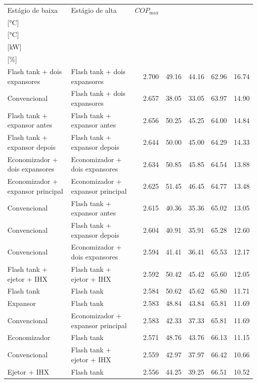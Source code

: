 {\small\setlength{\tabcolsep}{4pt}\renewcommand{\arraystretch}{1.12}
\begin{tabular}{llrrrrr}
\toprule
Estágio de baixa & Estágio de alta & $COP_{\max}$ & \shortstack{$T_{\mathrm{cond,l}}^*$\\{[°C]}} & \shortstack{$T_{\mathrm{evap,h}}^*$\\{[°C]}} & \shortstack{$\dot W_{\mathrm{liq}}$\\{[kW]}} & \shortstack{$\Delta COP_{\mathrm{opt}}$\\{[\%]}} \\
\midrule
Flash tank + dois expansores & Flash tank + dois expansores & 2.700 & 49.16 & 44.16 & 62.96 & 16.74 \\
Convencional & Flash tank + dois expansores & 2.657 & 38.05 & 33.05 & 63.97 & 14.90 \\
Flash tank + expansor antes & Flash tank + expansor antes & 2.656 & 50.25 & 45.25 & 64.00 & 14.84 \\
Flash tank + expansor depois & Flash tank + expansor depois & 2.644 & 50.00 & 45.00 & 64.29 & 14.33 \\
Economizador + dois expansores & Economizador + dois expansores & 2.634 & 50.85 & 45.85 & 64.54 & 13.88 \\
Economizador + expansor principal & Economizador + expansor principal & 2.625 & 51.45 & 46.45 & 64.77 & 13.48 \\
Convencional & Flash tank + expansor antes & 2.615 & 40.36 & 35.36 & 65.02 & 13.05 \\
Convencional & Flash tank + expansor depois & 2.604 & 40.91 & 35.91 & 65.28 & 12.60 \\
Convencional & Economizador + dois expansores & 2.594 & 41.41 & 36.41 & 65.53 & 12.17 \\
Flash tank + ejetor + IHX & Flash tank + ejetor + IHX & 2.592 & 50.42 & 45.42 & 65.60 & 12.05 \\
Flash tank & Flash tank & 2.584 & 50.62 & 45.62 & 65.80 & 11.71 \\
Expansor & Flash tank & 2.583 & 48.84 & 43.84 & 65.81 & 11.69 \\
Convencional & Economizador + expansor principal & 2.583 & 42.33 & 37.33 & 65.81 & 11.69 \\
Economizador & Flash tank & 2.571 & 48.76 & 43.76 & 66.13 & 11.15 \\
Convencional & Flash tank + ejetor + IHX & 2.559 & 42.97 & 37.97 & 66.42 & 10.66 \\
Ejetor + IHX & Flash tank & 2.556 & 44.25 & 39.25 & 66.51 & 10.52 \\

\end{tabular}}
